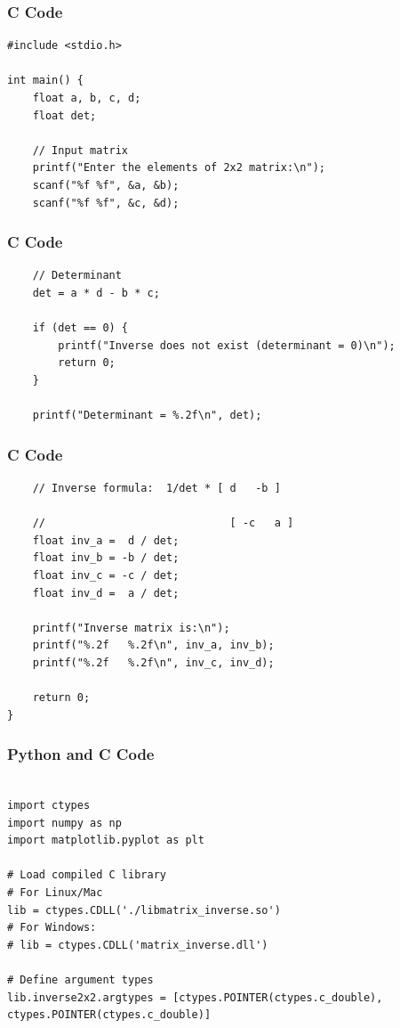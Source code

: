 \documentclass{beamer}
\begin{document}
\begin{frame}[fragile]
\frametitle{C Code}
\begin{lstlisting}
#include <stdio.h>

int main() {
    float a, b, c, d;
    float det;
    
    // Input matrix
    printf("Enter the elements of 2x2 matrix:\n");
    scanf("%f %f", &a, &b);
    scanf("%f %f", &c, &d);
    \end{lstlisting}
\end{frame}

\begin{frame}[fragile]
\frametitle{C Code}
\begin{lstlisting}
    // Determinant
    det = a * d - b * c;

    if (det == 0) {
        printf("Inverse does not exist (determinant = 0)\n");
        return 0;
    }

    printf("Determinant = %.2f\n", det);
    \end{lstlisting}
\end{frame}

\begin{frame}[fragile]
\frametitle{C Code}
\begin{lstlisting}
    // Inverse formula:  1/det * [ d   -b ]
    
    //                             [ -c   a ]
    float inv_a =  d / det;
    float inv_b = -b / det;
    float inv_c = -c / det;
    float inv_d =  a / det;

    printf("Inverse matrix is:\n");
    printf("%.2f   %.2f\n", inv_a, inv_b);
    printf("%.2f   %.2f\n", inv_c, inv_d);

    return 0;
}
   \end{lstlisting}
\end{frame}

\begin{frame}[fragile]
\frametitle{Python and C Code}

\begin{lstlisting}

import ctypes
import numpy as np
import matplotlib.pyplot as plt

# Load compiled C library
# For Linux/Mac
lib = ctypes.CDLL('./libmatrix_inverse.so')
# For Windows:
# lib = ctypes.CDLL('matrix_inverse.dll')

# Define argument types
lib.inverse2x2.argtypes = [ctypes.POINTER(ctypes.c_double), ctypes.POINTER(ctypes.c_double)]
  \end{lstlisting}
\end{frame}
\end{document}
